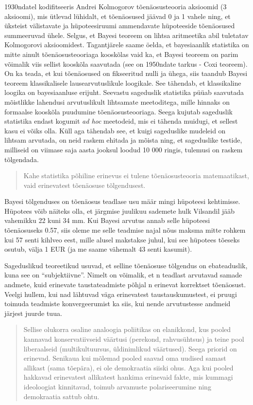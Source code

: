 \documentclass[]{book}
\begin{document}
1930ndatel kodifitseeris Andrei Kolmogorov tõenäosusteooria aksioomid (3 aksioomi), mis ütlevad lühidalt, et tõenäosused jäävad 0 ja 1 vahele ning, et üksteist välistavate ja hüpoteesiruumi ammendavate hüpoteeside tõenäosused summeeruvad ühele.
Selgus, et Bayesi teoreem on lihtsa aritmeetika abil tuletatav Kolmogorovi aksioomidest.
Tagantjärele saame öelda, et bayesiaanlik statistika on mitte ainult tõenäosusteooriaga kooskõlas vaid ka, et Bayesi teoreem on parim võimalik viis sellist kooskõla saavutada (see on 1950ndate tarkus - Coxi teoreem).
On ka teada, et kui tõenäosused on fikseeritud nulli ja ühega, siis taandub Bayesi teoreem klassikalisele lausearvutuslikule loogikale.
See tähendab, et klassikaline loogika on bayesiaanluse erijuht.
Seevastu sageduslik statistika püüab saavutada mõistlikke lahendusi arvutuslikult lihtsamate meetoditega, mille hinnaks on formaalse kooskõla puudumine tõenäosusteooriaga.
Seega kujutab sageduslik statistika endast kogumit \emph{ad hoc} meetodeid, mis ei tähenda muidugi, et sellest kasu ei võiks olla.
Küll aga tähendab see, et kuigi sageduslike mudeleid on lihtsam arvutada, on neid raskem ehitada ja mõista ning, et sageduslike testide, milliseid on viimase saja aasta jooksul loodud 10 000 ringis, tulemusi on raskem tõlgendada.

\begin{quote}
Kahe statistika põhiline erinevus ei tulene tõenäosusteooria matemaatikast, vaid erinevatest tõenäosuse tõlgendusest.
\end{quote}

Bayesi tõlgenduses on tõenäosus teadlase usu määr mingi hüpoteesi kehtimisse.
Hüpotees võib näiteks olla, et järgmise juulikuu sademete hulk Vilsandil jääb vahemikku 22 kuni 34 mm.
Kui Bayesi arvutus annab selle hüpoteesi tõenäosuseks 0.57, siis oleme me selle teadmise najal nõus maksma mitte rohkem kui 57 senti kihlveo eest, mille alusel makstakse juhul, kui see hüpotees tõeseks osutub, välja 1 EUR (ja me saame vähemalt 43 senti kasumit).

Sageduslikud teoreetikud usuvad, et selline tõenäosuse tõlgendus on ebateaduslik, kuna see on ``subjektiivne''.
Nimelt on võimalik, et n teadlast arvutavad samade andmete, kuid erinevate taustateadmiste põhjal n erinevat korrektset tõenäosust. Veelgi hullem, kui nad lähtuvad väga erinevatest taustauskumustest, ei pruugi toimuda teadmiste konvergeerumist ka siis, kui nende arvutustesse andmeid järjest juurde tuua.

\begin{quote}
Sellise olukorra osaline analoogia poliitikas on elanikkond, kus pooled kannavad konservatiivseid väärtusi (perekond, rahvusühtsus) ja teine pool liberaalseid (multikultuursus, üldinimlikud väärtused). Seega priorid on erinevad. Senikaua kui mõlemad pooled saavad oma uudised samast allikast (sama tõepära), ei ole demokraatia siiski ohus. Aga kui pooled hakkavad erinevatest allikatest hankima erinevaid fakte, mis kummagi ideoloogiat kinnitavad, toimub arvamuste polariseerumine ning demokraatia sattub ohtu.
\end{quote}
\end{document}
